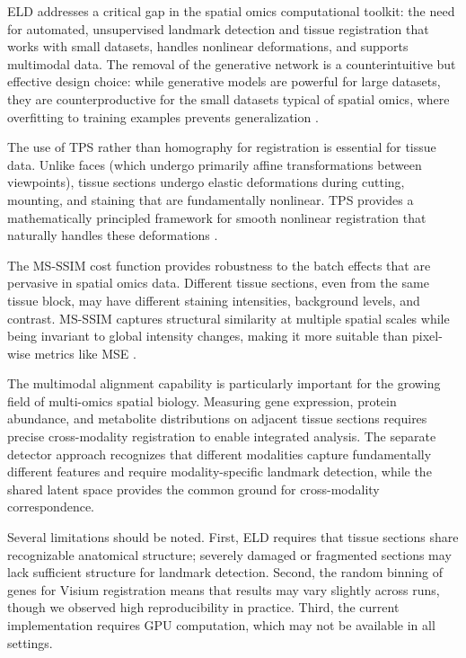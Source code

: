 \documentclass[11pt]{article}
\begin{document}
ELD addresses a critical gap in the spatial omics computational toolkit: the need for automated, unsupervised landmark detection and tissue registration that works with small datasets, handles nonlinear deformations, and supports multimodal data. The removal of the generative network is a counterintuitive but effective design choice: while generative models are powerful for large datasets, they are counterproductive for the small datasets typical of spatial omics, where overfitting to training examples prevents generalization \citep{thewlis2017}.

The use of TPS rather than homography for registration is essential for tissue data. Unlike faces (which undergo primarily affine transformations between viewpoints), tissue sections undergo elastic deformations during cutting, mounting, and staining that are fundamentally nonlinear. TPS provides a mathematically principled framework for smooth nonlinear registration that naturally handles these deformations \citep{bookstein1989}.

The MS-SSIM cost function provides robustness to the batch effects that are pervasive in spatial omics data. Different tissue sections, even from the same tissue block, may have different staining intensities, background levels, and contrast. MS-SSIM captures structural similarity at multiple spatial scales while being invariant to global intensity changes, making it more suitable than pixel-wise metrics like MSE \citep{wang2003}.

The multimodal alignment capability is particularly important for the growing field of multi-omics spatial biology. Measuring gene expression, protein abundance, and metabolite distributions on adjacent tissue sections requires precise cross-modality registration to enable integrated analysis. The separate detector approach recognizes that different modalities capture fundamentally different features and require modality-specific landmark detection, while the shared latent space provides the common ground for cross-modality correspondence.

Several limitations should be noted. First, ELD requires that tissue sections share recognizable anatomical structure; severely damaged or fragmented sections may lack sufficient structure for landmark detection. Second, the random binning of genes for Visium registration means that results may vary slightly across runs, though we observed high reproducibility in practice. Third, the current implementation requires GPU computation, which may not be available in all settings.
\end{document}

